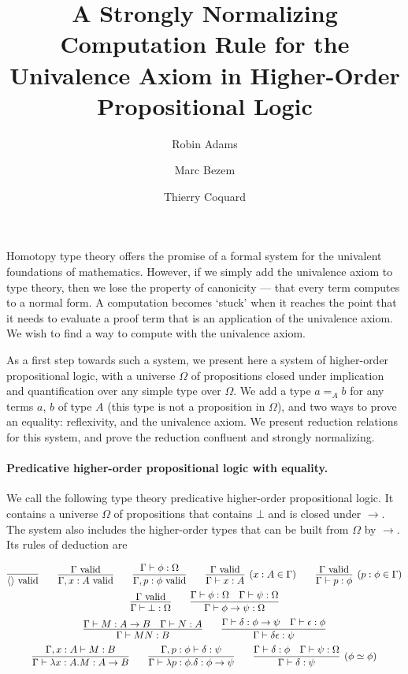 \documentclass{easychair}
\title{A Strongly Normalizing Computation Rule for the Univalence Axiom in Higher-Order Propositional Logic}
\author{Robin Adams\inst{1} \and Marc Bezem\inst{1} \and Thierry Coquard\inst{2}}
\institute{Universitetet i Bergen,
Bergen, Norway \\
\email{\{robin.adams,marc\}@uib.no}
\and
University of Gothenburg,
Gothenburg, Sweden \\
\email{coquand@chalmers.se}}
\newcommand{\vald}{\ \mathrm{valid}}
\begin{document}
\maketitle

Homotopy type theory offers the promise of a formal system for the univalent foundations of mathematics.  However, if
we simply add the univalence axiom to type theory, then we lose the property of canonicity --- that every term computes to
a normal form.  A computation becomes `stuck' when it reaches the point that it needs to evaluate a proof term
that is an application of the univalence axiom.  We wish to find a way to compute with the univalence axiom.

As a first step towards such a system, we present here a system of higher-order propositional logic,  with a universe $\Omega$ of propositions
closed under implication and quantification over any simple type over $\Omega$.  We add a type $a =_A b$ for any terms $a$, $b$ of type $A$
(this type is not a proposition in $\Omega$), and two ways to prove an equality: reflexivity, and the univalence axiom.  We present
reduction relations for this system, and prove the reduction confluent and strongly normalizing.

\paragraph{Predicative higher-order propositional logic with equality.}

We call the following type theory predicative higher-order propositional logic.  It contains a universe $\Omega$ of propositions that contains $\bot$ and
is closed under $\rightarrow$.  The system also includes the higher-order types that can be built from $\Omega$ by $\rightarrow$.  Its rules of deduction are

\begin{gather*}
\infer{\langle \rangle \vald}{} \qquad
\infer{\Gamma, x : A \vald}{\Gamma \vald} \qquad 
\infer{\Gamma, p : \phi \vald}{\Gamma \vdash \phi : \Omega} \qquad
\infer[(x : A \in \Gamma)]{\Gamma \vdash x : A}{\Gamma \vald} \qquad
\infer[(p : \phi \in \Gamma)]{\Gamma \vdash p : \phi}{\Gamma \vald} \\
\infer{\Gamma \vdash \bot : \Omega}{\Gamma \vald} \qquad
\infer{\Gamma \vdash \phi \rightarrow \psi : \Omega}{\Gamma \vdash \phi : \Omega \quad \Gamma \vdash \psi : \Omega} \\
\infer{\Gamma \vdash M N : B} {\Gamma \vdash M : A \rightarrow B \quad \Gamma \vdash N : A} \qquad
\infer{\Gamma \vdash \delta \epsilon : \psi} {\Gamma \vdash \delta : \phi \rightarrow \psi \quad \Gamma \vdash \epsilon : \phi} \\
\infer{\Gamma \vdash \lambda x:A.M : A \rightarrow B}{\Gamma, x : A \vdash M : B} \qquad
\infer{\Gamma \vdash \lambda p : \phi . \delta : \phi \rightarrow \psi}{\Gamma, p : \phi \vdash \delta : \psi} \qquad
\infer[(\phi \simeq \phi)]{\Gamma \vdash \delta : \psi}{\Gamma \vdash \delta : \phi \quad \Gamma \vdash \psi : \Omega}
\end{gather*}
\end{document}
